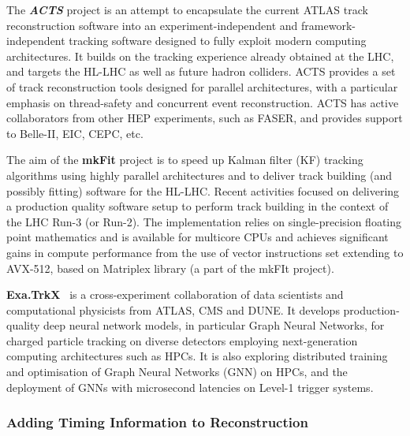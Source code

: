 The \emph{\textbf{ACTS}} project \cite{Ai:2019kze,Gumpert_2017} is an attempt to encapsulate
the current ATLAS track reconstruction software into an
experiment-independent and framework-independent tracking software
designed to fully exploit modern computing architectures. It builds on
the tracking experience already obtained at the LHC, and targets the
HL-LHC as well as future hadron colliders. ACTS provides a set of track
reconstruction tools designed for parallel architectures, with a
particular emphasis on thread-safety and concurrent event
reconstruction. ACTS has active collaborators from other HEP
experiments, such as FASER, and provides support to Belle-II, EIC, CEPC,
etc.

The aim of the \textbf{mkFit} project is to speed up Kalman filter (KF)
tracking algorithms using highly parallel architectures and to deliver
track building (and possibly fitting) software for the HL-LHC. Recent
activities focused on delivering a production quality software setup to
perform track building in the context of the LHC Run-3 (or Run-2). The
implementation relies on single-precision floating point mathematics and is
available for multicore CPUs and achieves significant gains in compute
performance from the use of vector instructions set extending to
AVX-512, based on Matriplex library (a part of the mkFIt project).

\textbf{Exa.TrkX}~\cite{Ju:2020xty} is a cross-experiment collaboration of data scientists
and computational physicists from ATLAS, CMS and DUNE. It develops
production-quality deep neural network models, in particular Graph
Neural Networks, for charged particle tracking on diverse detectors
employing next-generation computing architectures such as HPCs. It is
also exploring distributed training and optimisation of Graph Neural
Networks (GNN) on HPCs, and the deployment of GNNs with microsecond
latencies on Level-1 trigger systems.

\hypertarget{addition-of-timing-information-in-reconstruction}{%
\subsubsection{Adding Timing Information to
Reconstruction}\label{addition-of-timing-information-in-reconstruction}}

